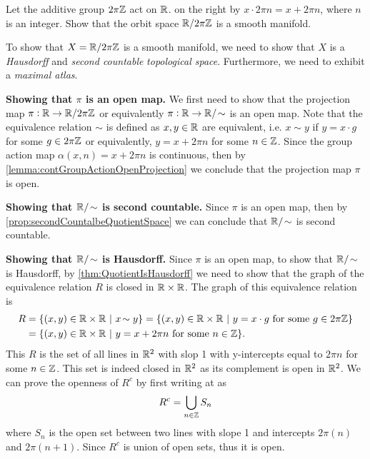  
 \begin{problem}
 	Let the additive group $ 2\pi\mathbb{Z} $ act on $ \mathbb{R} $. on the right by $ x\cdot 2\pi n = x + 2\pi n $, where $ n $ is an integer. Show that the orbit space $ \mathbb{R}/2\pi\mathbb{Z} $ is a smooth manifold.
 \end{problem}
 \begin{solution}
 	To show that $ X = \mathbb{R}/2\pi\mathbb{Z} $ is a smooth manifold, we need to show that $ X $ is a \emph{Hausdorff} and \emph{second countable} \emph{topological space}. Furthermore, we need to exhibit a \emph{maximal atlas}.
 	
 	\textbf{Showing that $ \pi $ is an open map.} We first need to show that the projection map $ \pi: \mathbb{R} \to \mathbb{R}/2\pi\mathbb{Z}  $ or equivalently $ \pi: \R \to \R/\sim $ is an open map. Note that the equivalence relation $ \sim $ is defined as $ x,y\in \mathbb{R} $ are equivalent, i.e. $ x\sim y $ if $ y = x\cdot g $ for some $ g\in 2\pi\mathbb{Z} $ or equivalently, $ y = x + 2\pi n $ for some $ n \in \mathbb{Z} $. Since the group action map $ \alpha(x,n) = x + 2\pi n $ is continuous, then by \autoref{lemma:contGroupActionOpenProjection} we conclude that the projection map $ \pi $ is open.
 	
 	\noindent \textbf{Showing that $ \R/\sim$ is second countable.} Since $ \pi $ is an open map, then by \autoref{prop:secondCountalbeQuotientSpace} we can conclude that $ \R/\sim $ is second countable.
 	
 	\noindent \textbf{Showing that $ \R/\sim $ is Hausdorff.} Since $ \pi $ is an open map, to show that $ \R/\sim $ is Hausdorff, by \autoref{thm:QuotientIsHausdorff} we need to show that the graph of the equivalence relation $ R $ is closed in $ \mathbb{R}\times \mathbb{R} $. The graph of this equivalence relation is
 	\begin{align*}
 		R &= \set{(x,y) \in \R\times \R \ |\ x\sim y} = \set{(x,y) \in \R\times \R \ |\ y = x\cdot g \ \text{for some $ g \in 2\pi\Z $}}\\
 		 &= \set{(x,y) \in \R\times \R\ |\ y = x + 2\pi n \ \text{for some $ n \in \Z $}}.
 	\end{align*}
	This $ R $ is the set of all lines in $ \mathbb{R}^2 $ with slop 1 with y-intercepts equal to $ 2\pi n $ for some $ n \in \mathbb{Z} $. This set is indeed closed in $ \mathbb{R}^2 $ as its complement is open in $ \mathbb{R}^2 $. We can prove the openness of $ R^c $ by first writing at as
	\[ R^c = \bigcup_{n \in \mathbb{Z}} S_n \]
	where $ S_n $ is the open set between two lines with slope 1 and intercepts $ 2\pi(n) $ and $ 2\pi(n+1) $. Since $ R^c $ is union of open sets, thus it is open.
	

\end{solution}
